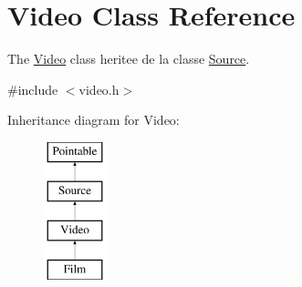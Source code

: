 \hypertarget{classVideo}{\section{Video Class Reference}
\label{classVideo}
}


The \hyperlink{classVideo}{Video} class heritee de la classe \hyperlink{classSource}{Source}.  




{\ttfamily \#include $<$video.\-h$>$}

Inheritance diagram for Video\-:\begin{figure}[H]
\begin{center}
\leavevmode
\includegraphics[height=4.000000cm]{classVideo}
\end{center}
\end{figure}
